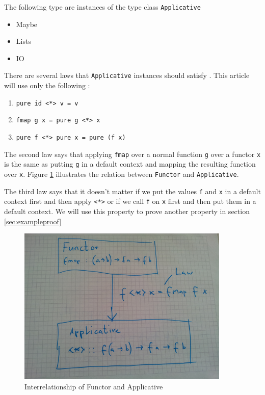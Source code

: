 The following type are instances of the type class \verb|Applicative| 

\begin{itemize}
\item Maybe
\item Lists
\item IO
\end{itemize}

There are several laws that \verb|Applicative| instances should satisfy \cite{mcbride} \cite{control.applicative}. This article will use only the following :

\begin{enumerate}
\item \verb|pure id <*> v = v|
\item \verb|fmap g x = pure g <*> x|
\item \verb|pure f <*> pure x = pure (f x)|
\end{enumerate}

The second law says that applying \verb|fmap| over a normal function \verb|g| over a functor \verb|x| is the same as putting \verb|g| in a default context and mapping the resulting function over \verb|x|. Figure \ref{fig:functor_applicative} illustrates the relation between \verb|Functor| and \verb|Applicative|.

The third law says that it doesn't matter if we put the values \verb|f| and \verb|x| in a default context first and then apply \verb|<*>| or if we call \verb|f| on \verb|x| first and then put them in a default context. We will use this property to prove another property in section \ref{sec:exampleproof}

\begin{figure}
  \centering
     \includegraphics[width=0.9\textwidth]{functor_applicative}
  \caption{Interrelationship of Functor and Applicative }
  \label{fig:functor_applicative}
\end{figure}

